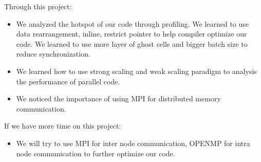 \documentclass[11pt]{article}
\begin{document}
    Through this project:
    \begin{itemize}
        \item We analyzed the hotspot of our code through profiling. We learned to use data rearrangement, inline, restrict
        pointer to help compiler optimize our code. We learned to use more layer of ghost cells and bigger batch size to
        reduce synchronization.
        \item We learned how to use strong scaling and weak scaling paradigm to analysis the performance of parallel code.
        \item We noticed the importance of using MPI for distributed memory communication.
    \end{itemize}

	If we have more time on this project:
    \begin{itemize}
    	\item We will try to use MPI for inter node communication, OPENMP for intra node communication to further optimize our
        code.
    \end{itemize}
\end{document}
